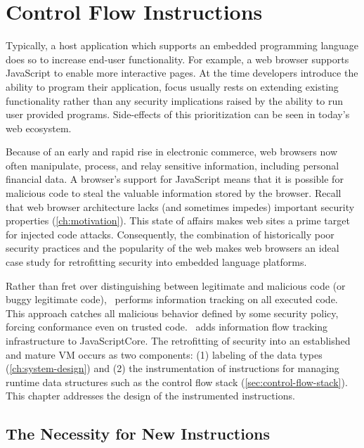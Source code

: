 
\newcommand{\popj}{\code{POPJ\_CFLABEL} }
\newcommand{\dup}{\code{DUP\_CFLABEL} }
\newcommand{\join}{\code{JOIN\_CFLABEL} }

\chapter{Control Flow Instructions}
\label{ch:instructions}

Typically, a host application which supports an embedded programming language does so to increase end-user functionality.
For example, a web browser supports JavaScript to enable more interactive pages.
At the time developers introduce the ability to program their application, focus usually rests on extending existing functionality rather than any security implications raised by the ability to run user provided programs.
Side-effects of this prioritization can be seen in today's web ecosystem.

Because of an early and rapid rise in electronic commerce, web browsers now often manipulate, process, and relay sensitive information, including personal financial data.
A browser's support for JavaScript means that it is possible for malicious code to steal the valuable information stored by the browser.
Recall that web browser architecture lacks (and sometimes impedes) important security properties (\autoref{ch:motivation}).
This state of affairs makes web sites a prime target for injected code attacks.
Consequently, the combination of historically poor security practices and the popularity of the web makes web browsers an ideal case study for retrofitting security into embedded language platforms.

Rather than fret over distinguishing between legitimate and malicious code (or buggy legitimate code), \FlowCore\ performs information tracking on all executed code.
This approach catches all malicious behavior defined by some security policy, forcing conformance even on trusted code.
\FlowCore\ adds information flow tracking infrastructure to JavaScriptCore.
The retrofitting of security into an established and mature VM occurs as two components:
(1) labeling of the data types (\autoref{ch:system-design}) and
(2) the instrumentation of instructions for managing runtime data structures such as the control flow stack (\autoref{sec:control-flow-stack}).
This chapter addresses the design of the instrumented instructions.

\section{The Necessity for New Instructions}

